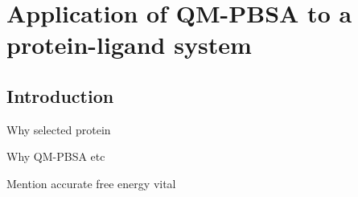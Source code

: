 \chapter{Application of QM-PBSA to a protein-ligand system} \label{Chapter:biasing_potentials}

\section{Introduction}

Why selected protein

Why QM-PBSA etc

Mention accurate free energy vital





